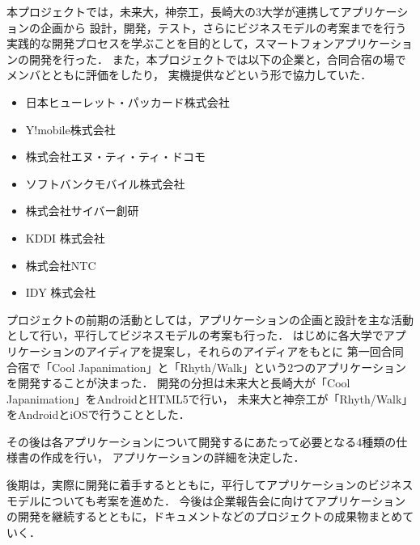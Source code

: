 \par
本プロジェクトでは，未来大，神奈工，長崎大の3大学が連携してアプリケーションの企画から
設計，開発，テスト，さらにビジネスモデルの考案までを行う実践的な開発プロセスを学ぶことを目的として，スマートフォンアプリケーションの開発を行った．
また，本プロジェクトでは以下の企業と，合同合宿の場でメンバとともに評価をしたり，
実機提供などという形で協力していた．

\begin{itemize}
\item 日本ヒューレット・パッカード株式会社
\item Y!mobile株式会社
\item 株式会社エヌ・ティ・ティ・ドコモ
\item ソフトバンクモバイル株式会社
\item 株式会社サイバー創研
\item KDDI 株式会社
\item 株式会社NTC
\item IDY 株式会社
\end{itemize}

プロジェクトの前期の活動としては，アプリケーションの企画と設計を主な活動として行い，平行してビジネスモデルの考案も行った．
はじめに各大学でアプリケーションのアイディアを提案し，それらのアイディアをもとに
第一回合同合宿で「Cool Japanimation」と「Rhyth/Walk」という2つのアプリケーションを開発することが決まった．
開発の分担は未来大と長崎大が「Cool Japanimation」をAndroidとHTML5で行い，
未来大と神奈工が「Rhyth/Walk」をAndroidとiOSで行うこととした．

その後は各アプリケーションについて開発するにあたって必要となる4種類の仕様書の作成を行い，
アプリケーションの詳細を決定した．
\par
後期は，実際に開発に着手するとともに，平行してアプリケーションのビジネスモデルについても考案を進めた．
今後は企業報告会に向けてアプリケーションの開発を継続するとともに，ドキュメントなどのプロジェクトの成果物まとめていく．
